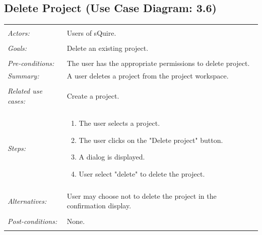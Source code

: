 \documentclass[11pt]{report}
\begin{document}
\subsection{Delete Project (Use Case Diagram: 3.6)}
\begin{tabular}{ p{2cm} p{12cm} }
\hline
\\
\textit{Actors:} & Users of sQuire.\\
\\
\textit{Goals:} & Delete an existing project. \\
\\
\textit{Pre-conditions:} & The user has the appropriate permissions to delete project. 
\\
\textit{Summary:} & A user deletes a project from the project workspace.\\
\\
\textit{Related use cases:} & Create a project. \\
\\
\textit{Steps:} & \begin{enumerate}
 \item The user selects a project.
 \item The user clicks on the "Delete project" button. 
 \item A dialog is displayed. 
 \item User select "delete" to delete the project. 
 \end{enumerate}\\
 \\
 \textit{Alternatives:} & User may choose not to delete the project in the confirmation display.\\
 \\
 \textit{Post-conditions:} & None. \\
 \\
\hline
\end{tabular}
\end{document}
